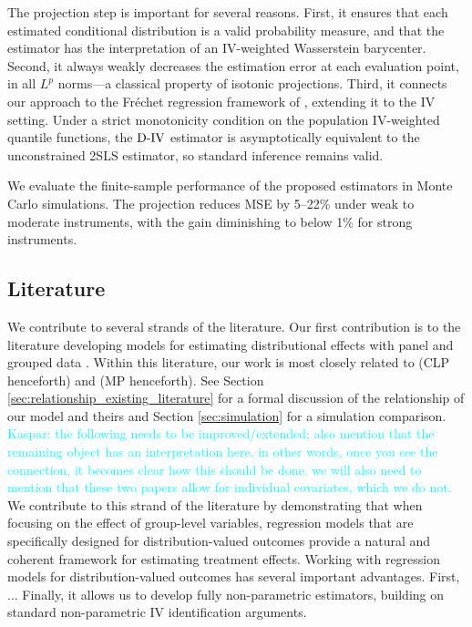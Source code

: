 \documentclass[12pt]{article}
\newcommand{\kw}[1]{\textcolor{cyan}{Kaspar: #1}}
\newcommand{\est}{\ensuremath{\textnormal{D-IV}}\xspace}
\newcommand{\CLP}{CLP\xspace}
\newcommand{\MP}{MP\xspace}
\begin{document}
The projection step is important for several reasons. First, it ensures that each estimated conditional distribution is a valid probability measure, and that the estimator has the interpretation of an IV-weighted Wasserstein barycenter. Second, it always weakly decreases the estimation error at each evaluation point, in all $L^p$ norms---a classical property of isotonic projections. Third, it connects our approach to the Fr\'echet regression framework of \citet{petersen2019frechet}, extending it to the IV setting. Under a strict monotonicity condition on the population IV-weighted quantile functions, the \est estimator is asymptotically equivalent to the unconstrained 2SLS estimator, so standard inference remains valid.

We evaluate the finite-sample performance of the proposed estimators in Monte Carlo simulations. The projection reduces MSE by 5--22\% under weak to moderate instruments, with the gain diminishing to below 1\% for strong instruments.


\subsection{Literature}

We contribute to several strands of the literature. Our first contribution is to the literature developing models for estimating distributional effects with panel and grouped data \citep[e.g.,][]{koenker2004quantile,canay2011simple,galvao2015efficient,galvao2016smoothed,chetverikov2016iv,galvao2020unbiased,chernozhukov2024network,pons2024quantile,melly2025minimum}. Within this literature, our work is most closely related to \citet{chetverikov2016iv} (\CLP henceforth) and \citet{melly2025minimum} (\MP henceforth). See Section \ref{sec:relationship_existing_literature} for a formal discussion of the relationship of our model and theirs and Section \ref{sec:simulation} for a simulation comparison. \kw{the following needs to be improved/extended; also mention that the remaining object has an interpretation here. in other words, once you see the connection, it becomes clear how this should be done. we will also need to mention that these two papers allow for individual covariates, which we do not.} We contribute to this strand of the literature by demonstrating that when focusing on the effect of group-level variables, regression models that are specifically designed for distribution-valued outcomes provide a natural and coherent framework for estimating treatment effects. Working with regression models for distribution-valued outcomes has several important advantages. First, ... Finally, it allows us to develop fully non-parametric estimators, building on standard non-parametric IV identification arguments.
\end{document}
